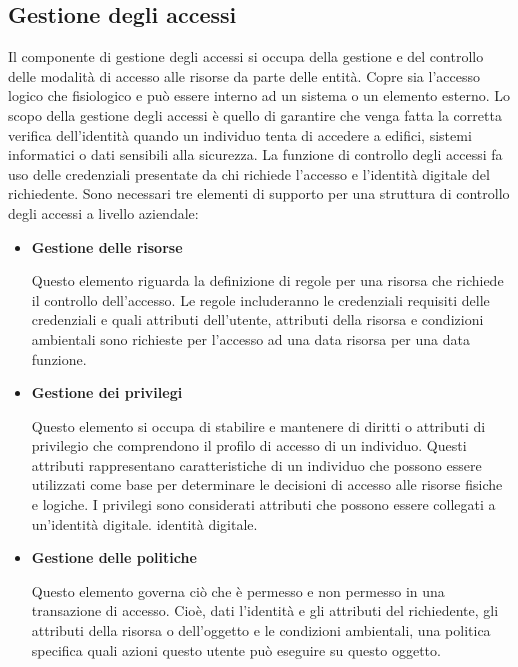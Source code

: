 \subsection{Gestione degli accessi}
Il componente di gestione degli accessi si occupa della gestione e del controllo delle modalità di accesso alle risorse da parte delle entità. Copre sia l'accesso logico che fisiologico e può essere interno ad un sistema o un elemento esterno. Lo scopo della gestione degli accessi è quello di garantire che venga fatta la corretta verifica dell'identità quando un individuo tenta di accedere a edifici, sistemi informatici o dati sensibili alla sicurezza. La funzione di controllo degli accessi fa uso delle credenziali presentate da chi richiede l'accesso e l'identità digitale del richiedente.
\singlespacing
Sono necessari tre elementi di supporto per una struttura di controllo degli accessi a livello aziendale:
\begin{itemize}
    \item \textbf{Gestione delle risorse}
    
Questo elemento riguarda la definizione di regole per una risorsa che richiede il controllo dell'accesso. Le regole includeranno le credenziali requisiti delle credenziali e quali attributi dell'utente, attributi della risorsa e condizioni ambientali sono richieste per l'accesso ad una data risorsa per una data funzione.

\item \textbf{Gestione dei privilegi}

Questo elemento si occupa di stabilire e mantenere di diritti o attributi di privilegio che comprendono il profilo di accesso di un individuo. Questi attributi rappresentano caratteristiche di un individuo che possono essere utilizzati come base per determinare le decisioni di accesso alle risorse fisiche e logiche. I privilegi sono considerati attributi che possono essere collegati a un'identità digitale. identità digitale.

\item \textbf{Gestione delle politiche}

Questo elemento governa ciò che è permesso e non permesso in una transazione di accesso. Cioè, dati l'identità e gli attributi del richiedente, gli attributi della risorsa o dell'oggetto e le condizioni ambientali, una politica specifica quali azioni questo utente può eseguire su questo oggetto.
\end{itemize}
\newpage
